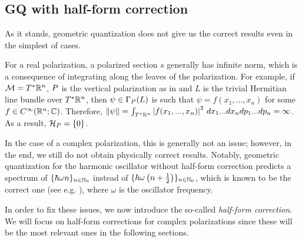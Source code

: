 \documentclass[notas.tex]{subfiles}
\begin{document}

\subsection{GQ with half-form correction} \label{sec_gq_with_hf}

As it stands, geometric quantization does not give us the correct results even in the simplest of cases. 

For a real polarization, a polarized section $s$ generally has infinite norm, which is a consequence of integrating along the leaves of the polarization. For example, if $\mathcal{M} = T^*\mathbb{R}^n$, $P$ is the vertical polarization as in  and $L$ is the trivial Hermitian line bundle over $T^*\mathbb{R}^n$, then $\psi \in \Gamma_P(L)$ is such that $\psi = f(x_1,...,x_n)$ for some $f \in C^\infty(\mathbb{R}^n; \mathbb{C})$. Therefore, $\left\lVert\psi\right\rVert = \int_{T^*\mathbb{R}^n}\left|f(x_1,...,x_n)\right|^2 \, dx_1...dx_n dp_1...dp_n = \infty$. As a result, $\mathcal{H}_P = \{0\}$.

In the case of a complex polarization, this is generally not an issue; however, in the end, we still do not obtain physically correct results. Notably, geometric quantization for the harmonic oscillator without half-form correction predicts a spectrum of $\{\hbar \omega n\}_{n \in \mathbb{N}_0}$ instead of $\{\hbar \omega\left( n+\frac{1}{2} \right)\}_{n \in \mathbb{N}_0}$, which is known to be the correct one (see e.g. \cite[(2.62)]{griffiths_introduction_2018}), where $\omega$ is the oscillator frequency.

In order to fix these issues, we now introduce the so-called \emph{half-form correction}. We will focus on half-form corrections for complex polarizations since these will be the most relevant ones in the following sections.
\end{document}

